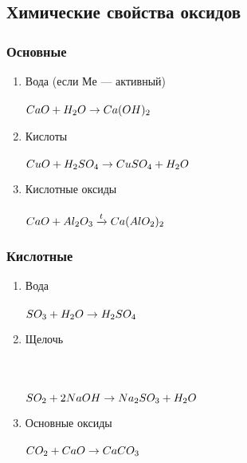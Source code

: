 \subsection{Химические свойства оксидов}
\subsubsection{Основные}
\begin{enumerate}
    \item Вода (если $Ме$ --- активный)\\
        \\
        $CaO + H_2O \rightarrow Ca(OH)_2$

    \item Кислоты\\
        \\
        $CuO + H_2SO_4 \rightarrow CuSO_4 + H_2O$

    \item Кислотные оксиды\\
        \\
        $CaO + Al_2O_3 \xrightarrow{t} Ca(AlO_2)_2$

\end{enumerate}


\subsubsection{Кислотные}
\begin{enumerate}
    \item Вода\\
        \\
        $SO_3 + H_2O \rightarrow H_2SO_4$

    \item Щелочь\\
        \\
        \\
        \\
        $SO_2 + 2NaOH \rightarrow Na_2SO_3 + H_2O$

    \item Основные оксиды\\
        \\
        $CO_2 + CaO \rightarrow CaCO_3$
\end{enumerate}
